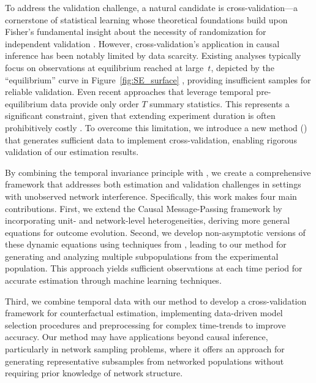 To address the validation challenge, a natural candidate is cross-validation---a cornerstone of statistical learning \citep{hastie2009elements} whose theoretical foundations \citep{stone1974cross,allen1974relationship} build upon Fisher's fundamental insight about the necessity of randomization for independent validation \citep{fisher1935design}. However, cross-validation's application in causal inference has been notably limited by data scarcity. Existing analyses typically focus on observations at equilibrium reached at large~$t$, depicted by the ``equilibrium'' curve in Figure~\ref{fig:SE_surface} \citep{basse2019randomization,jackson2020adjusting,li2022random}, providing insufficient samples for reliable validation. Even recent approaches that leverage temporal pre-equilibrium data \citep{shirani2024causal,bayati2024higher} provide only order $T$ summary statistics. This represents a significant constraint, given that extending experiment duration is often prohibitively costly \citep{holtz2020reducing,cooprider2023science,xiong2024optimal}. To overcome this limitation, we introduce a new \emph{\batching{}} method (\batchingAcronym{}) that generates sufficient data to implement cross-validation, enabling rigorous validation of our estimation results.

By combining the temporal invariance principle with \batchingAcronym{}, we create a comprehensive framework that addresses both estimation and validation challenges in settings with unobserved network interference. Specifically, this work makes four main contributions. First, we extend the Causal Message-Passing framework \citep{shirani2024causal} by incorporating unit- and network-level heterogeneities, deriving more general equations for outcome evolution. Second, we develop non-asymptotic versions of these dynamic equations using techniques from \cite{li2022non}, leading to our \batchingAcronym{} method for generating and analyzing multiple subpopulations from the experimental population. This approach yields sufficient observations at each time period for accurate estimation through machine learning techniques.

Third, we combine temporal data with our \batchingAcronym{} method to develop a cross-validation framework for counterfactual estimation, implementing data-driven model selection procedures and preprocessing for complex time-trends to improve accuracy. Our \batchingAcronym{} method may have applications beyond causal inference, particularly in network sampling problems, where it offers an approach for generating representative subsamples from networked populations without requiring prior knowledge of network structure.


